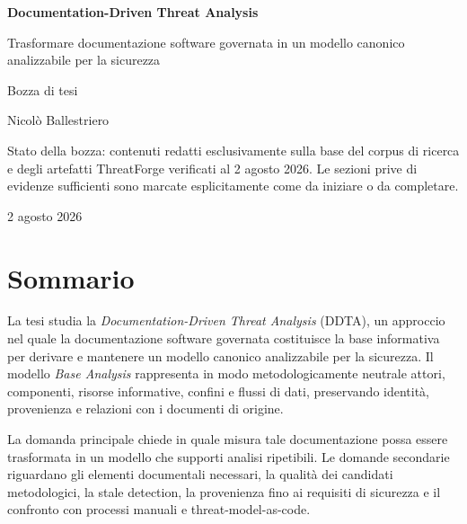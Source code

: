 \documentclass[12pt,a4paper,oneside]{report}
\begin{document}

\begin{titlepage}
  \centering
  \vspace*{2.2cm}
  {\Huge\bfseries Documentation-Driven Threat Analysis\par}
  \vspace{0.6cm}
  {\LARGE Trasformare documentazione software governata in un modello canonico analizzabile per la sicurezza\par}
  \vspace{2.2cm}
  {\Large Bozza di tesi\par}
  \vspace{0.6cm}
  {\large Nicolò Ballestriero\par}
  \vfill
  \begin{tcolorbox}[width=0.86\textwidth,colback=DDTAGray,colframe=DDTABorder,boxrule=0.7pt,arc=1.5mm]
    \sffamily\small
    Stato della bozza: contenuti redatti esclusivamente sulla base del corpus di ricerca e degli artefatti ThreatForge verificati al 2 agosto 2026. Le sezioni prive di evidenze sufficienti sono marcate esplicitamente come da iniziare o da completare.
  \end{tcolorbox}
  \vfill
  {\large 2 agosto 2026\par}
\end{titlepage}


\chapter*{Sommario}

La tesi studia la \emph{Documentation-Driven Threat Analysis} (DDTA), un approccio nel quale la documentazione software governata costituisce la base informativa per derivare e mantenere un modello canonico analizzabile per la sicurezza. Il modello \emph{Base Analysis} rappresenta in modo metodologicamente neutrale attori, componenti, risorse informative, confini e flussi di dati, preservando identità, provenienza e relazioni con i documenti di origine.

La domanda principale chiede in quale misura tale documentazione possa essere trasformata in un modello che supporti analisi ripetibili. Le domande secondarie riguardano gli elementi documentali necessari, la qualità dei candidati metodologici, la stale detection, la provenienza fino ai requisiti di sicurezza e il confronto con processi manuali e threat-model-as-code.
\end{document}
